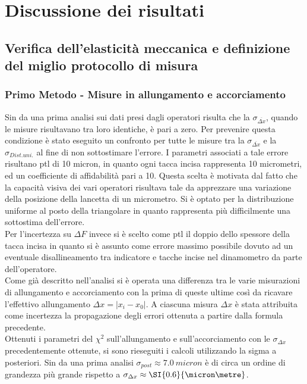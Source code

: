 \documentclass[a4paper,11pt,oneside]{article}
\begin{document}
\section{Discussione dei risultati}
\subsection{Verifica dell'elasticità meccanica e definizione del miglio protocollo di misura}\label{sec:discussione_prima_parte}
\subsubsection*{Primo Metodo - Misure in allungamento e accorciamento}
Sin da una prima analisi sui dati presi dagli operatori risulta che la $\sigma_{\overline{\Delta x}}$, quando le misure risultavano tra loro identiche, è pari a zero. Per prevenire questa condizione è stato eseguito un confronto per tutte le misure tra la $\sigma_{\overline{\Delta x}}$ e la $\sigma_{Dist. uni.}$ al fine di non sottostimare l'errore. I parametri associati a tale errore risultano ptl di 10 micron, in quanto ogni tacca incisa rappresenta 10 micrometri, ed un coefficiente di affidabilità pari a 10. Questa scelta è motivata dal fatto che la capacità visiva dei vari operatori risultava tale da apprezzare una variazione della posizione della lancetta di un micrometro. Si è optato per la distribuzione uniforme al posto della triangolare in quanto rappresenta più difficilmente una sottostima dell'errore.\\
Per l'incertezza su $\Delta F$ invece si è scelto come ptl il doppio dello spessore della tacca incisa in quanto si è assunto come errore massimo possibile dovuto ad un eventuale disallineamento tra indicatore e tacche incise nel dinamometro da parte dell'operatore.\\

Come già descritto nell'analisi si è operata una differenza tra le varie misurazioni di allungamento e accorciamento con la prima di queste ultime così da ricavare l'effettivo allungamento $\Delta x=| x_{i}-x_{0}|$. A ciascuna misura $\Delta x$ è stata attribuita come incertezza la propagazione degli errori ottenuta a partire dalla formula precedente.\\

Ottenuti i parametri del ${\chi}^2$ sull'allungamento e sull'accorciamento con le $\sigma_{\Delta x}$ precedentemente ottenute, si sono rieseguiti i calcoli utilizzando la sigma a posteriori. Sin da una prima analisi $\sigma_{post} \approx \SI{7.0}{micron}$ è di circa un ordine di grandezza più grande rispetto a $\sigma_{\Delta x} \approx \SI{0.6}{\micron\metre}$.
\end{document}
